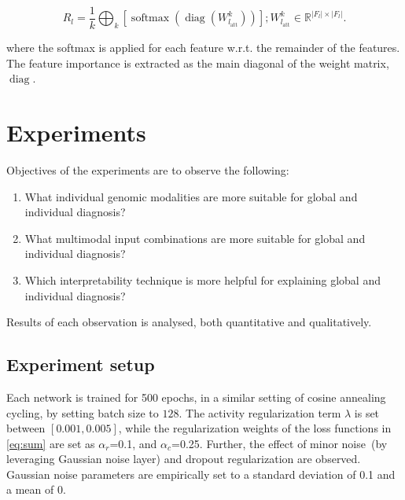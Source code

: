 \begin{equation}
    R_{l}=\frac{1}{k} \bigoplus_{k}\left[\operatorname{softmax}\left(\operatorname{diag}\left(W_{l_{\mathrm{att}}}^{k}\right)\right)\right] ; W_{l_{\mathrm{att}}}^{k} \in \mathbb{R}^{|F_l| \times|F_l|}.
\end{equation}

\hspace*{3.5mm} where the softmax is applied for each feature w.r.t. the remainder of the features. The feature importance is extracted as the main diagonal of the weight matrix, $\operatorname{diag}$. 


\section{Experiments}\label{chapter_5:results} 
Objectives of the experiments are to observe the following:

\begin{enumerate}[noitemsep]
    \item What individual genomic modalities are more suitable for global and individual diagnosis? 
    \item What multimodal input combinations are more suitable for global and individual diagnosis?
    \item Which interpretability technique is more helpful for explaining global and individual diagnosis?
\end{enumerate}

\hspace*{3.5mm} Results of each observation is analysed, both quantitative and qualitatively. 

\subsection{Experiment setup}
Each network is trained for 500 epochs, in a similar setting of cosine annealing cycling, by setting batch size to $128$. The activity regularization term $\lambda$ is set between $[0.001, 0.005]$, while the regularization weights of the loss functions in \cref{eq:sum} are set as  $\alpha_{r}$=0.1, and $\alpha_{c}$=0.25. Further, the effect of minor noise~(by leveraging Gaussian noise layer) and dropout regularization are observed. Gaussian noise parameters are empirically set to a standard deviation of 0.1 and a mean of 0. 

